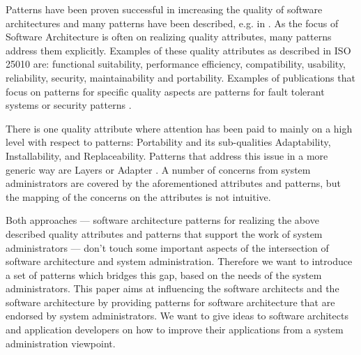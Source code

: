 Patterns have been proven successful in imcreasing the quality of software architectures \cite{Harrison2011} and many patterns have been described, e.g. in \cite{Buschmann1996,Buschmann2007,Fowler:2002:PEA:579257}. As the focus of Software Architecture is often on realizing quality attributes, many patterns address them explicitly. Examples of these quality attributes as described in ISO 25010 are: functional suitability, performance efficiency, compatibility, usability, reliability, security, maintainability and portability. Examples of publications that focus on patterns for specific quality aspects are patterns for fault tolerant systems \cite{Hanmer2007} or security patterns \cite{Schumacher2005}.

There is one quality attribute where attention has been paid to mainly on a high level with respect to patterns: Portability and its sub-qualities Adaptability, Installability, and Replaceability. Patterns that address this issue in a more generic way are {\sc Layers} \cite{Buschmann1996} or {\sc Adapter} \cite{Gamma95}. A number of concerns from system administrators are covered by the aforementioned attributes and patterns, but the mapping of the concerns on the attributes is not intuitive. 

Both approaches --- software architecture patterns for realizing the above described quality attributes and patterns that support the work of system administrators --- don't touch some important aspects of the intersection of software architecture and system administration. Therefore we want to introduce a set of patterns which bridges this gap, based on the needs of the system administrators. 
This paper aims at influencing the software architects and the software architecture by providing patterns for software architecture that are endorsed by system administrators. We want to give ideas to software architects and application developers on how to improve their applications from a system administration viewpoint.






